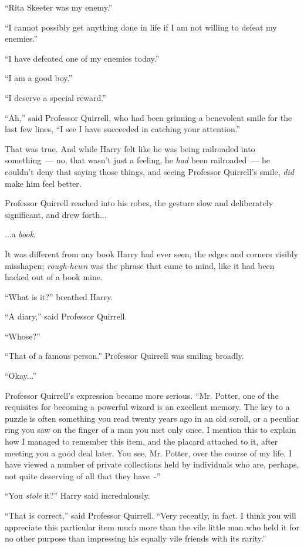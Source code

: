 ``Rita Skeeter was my enemy.''

``I cannot possibly get anything done in life if I am not willing to defeat my enemies.''

``I have defeated one of my enemies today.''

``I am a good boy.''

``I deserve a special reward.''

``Ah,'' said Professor Quirrell, who had been grinning a benevolent smile for the last few lines, ``I see I have succeeded in catching your attention.''

That was true. And while Harry felt like he was being railroaded into something~--- no, that wasn't just a feeling, he \emph{had} been railroaded~--- he couldn't deny that saying those things, and seeing Professor Quirrell's smile, \emph{did} make him feel better.

Professor Quirrell reached into his robes, the gesture slow and deliberately significant, and drew forth...

...a \emph{book}.

It was different from any book Harry had ever seen, the edges and corners visibly misshapen; \emph{rough-hewn} was the phrase that came to mind, like it had been hacked out of a book mine.

``What is it?'' breathed Harry.

``A diary,'' said Professor Quirrell.

``Whose?''

``That of a famous person.'' Professor Quirrell was smiling broadly.

``Okay...''

Professor Quirrell's expression became more serious. ``Mr. Potter, one of the requisites for becoming a powerful wizard is an excellent memory. The key to a puzzle is often something you read twenty years ago in an old scroll, or a peculiar ring you saw on the finger of a man you met only once. I mention this to explain how I managed to remember this item, and the placard attached to it, after meeting you a good deal later. You see, Mr. Potter, over the course of my life, I have viewed a number of private collections held by individuals who are, perhaps, not quite deserving of all that they have~-''

``You \emph{stole} it?'' Harry said incredulously.

``That is correct,'' said Professor Quirrell. ``Very recently, in fact. I think you will appreciate this particular item much more than the vile little man who held it for no other purpose than impressing his equally vile friends with its rarity.''

